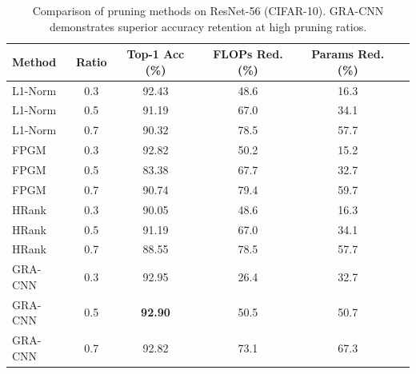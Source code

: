 \begin{table}[ht]
\centering
\caption{Comparison of pruning methods on ResNet-56 (CIFAR-10). GRA-CNN demonstrates superior accuracy retention at high pruning ratios.}
\label{tab:cifar10_results}
\begin{tabular}{lccccc}
\toprule
Method & Ratio & Top-1 Acc (\%) & FLOPs Red. (\%) & Params Red. (\%) \\
\midrule
L1-Norm & 0.3 & 92.43 & 48.6 & 16.3 \\
L1-Norm & 0.5 & 91.19 & 67.0 & 34.1 \\
L1-Norm & 0.7 & 90.32 & 78.5 & 57.7 \\
FPGM & 0.3 & 92.82 & 50.2 & 15.2 \\
FPGM & 0.5 & 83.38 & 67.7 & 32.7 \\
FPGM & 0.7 & 90.74 & 79.4 & 59.7 \\
HRank & 0.3 & 90.05 & 48.6 & 16.3 \\
HRank & 0.5 & 91.19 & 67.0 & 34.1 \\
HRank & 0.7 & 88.55 & 78.5 & 57.7 \\
GRA-CNN & 0.3 & 92.95 & 26.4 & 32.7 \\
GRA-CNN & 0.5 & \textbf{92.90} & 50.5 & 50.7 \\
GRA-CNN & 0.7 & 92.82 & 73.1 & 67.3 \\
\bottomrule
\end{tabular}
\end{table}